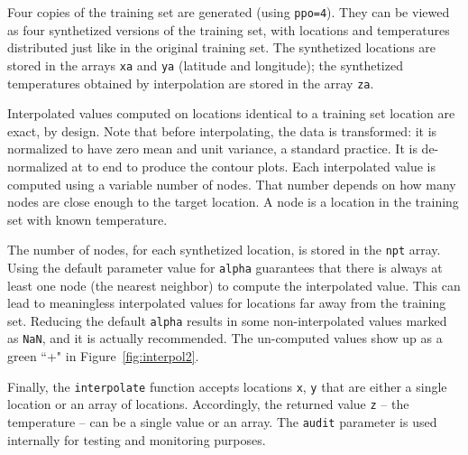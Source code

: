 \documentclass[oneside,10pt]{book}
\begin{document}
Four copies of the training set are generated (using \texttt{ppo=4}). They can be viewed as four synthetized versions of the training set, with locations and temperatures 
distributed just like in
 the original training set. The synthetized locations are stored in the arrays \texttt{xa} and \texttt{ya} (latitude and longitude); the synthetized temperatures obtained by interpolation are stored in the array \texttt{za}. 

Interpolated values computed on locations identical to a training set location are exact, by design. Note that before interpolating, the data is transformed: it is normalized to have zero mean and unit variance, a standard practice. It is de-normalized at to end to produce the contour plots. Each interpolated value is computed using a variable number of nodes. That number depends on how many nodes  are close enough to the target location. A node is a location in the training set with known temperature.

The number of nodes, for each synthetized location, is stored in the \texttt{npt} array. Using the default parameter value for \texttt{alpha} guarantees that there is always at least one node (the nearest neighbor) to compute the interpolated value. This can lead to meaningless interpolated values for locations far away from the training set. Reducing the default \texttt{alpha} results in some non-interpolated values marked as \texttt{NaN}, and it is actually recommended. The un-computed values show up as a green ``+" in Figure~\ref{fig:interpol2}.

Finally, the \texttt{interpolate} function accepts locations \texttt{x}, \texttt{y} that are either a single location or an array of locations. Accordingly, the returned value \texttt{z} -- the temperature -- can be a single value or an array.  The \texttt{audit} parameter is used internally for testing and monitoring purposes. 
\vspace{1ex}
\end{document}

